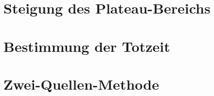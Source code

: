 \newpage
    \section{Steigung des Plateau-Bereichs}


    \section{Bestimmung der Totzeit}



    \section{Zwei-Quellen-Methode}